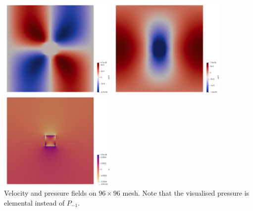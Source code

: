 \begin{center}
\includegraphics[width=5.7cm]{python_codes/fieldstone_76/results/block_rd/u}
\includegraphics[width=5.7cm]{python_codes/fieldstone_76/results/block_rd/v}
\includegraphics[width=5.7cm]{python_codes/fieldstone_76/results/block_rd/press}\\
{\captionfont Velocity and pressure fields on $96\times 96$ mesh. 
Note that the visualised pressure is elemental instead of $P_{-1}$.}
\end{center}







